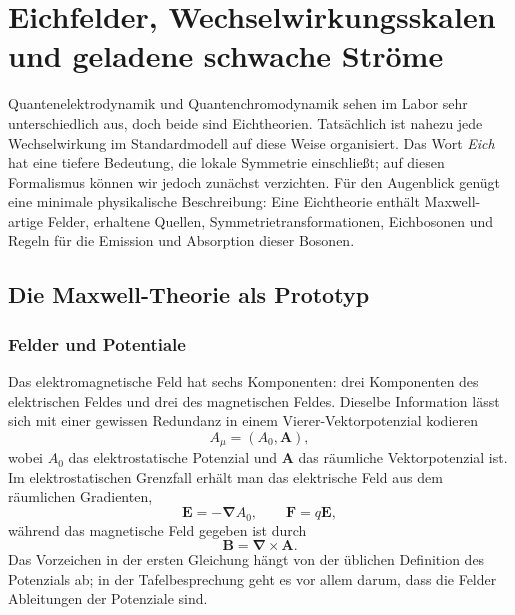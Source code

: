 \chapter{Eichfelder, Wechselwirkungsskalen und geladene schwache Ströme}

Quantenelektrodynamik und Quantenchromodynamik sehen im Labor sehr unterschiedlich aus, doch beide sind Eichtheorien. Tatsächlich ist nahezu jede Wechselwirkung im Standardmodell auf diese Weise organisiert. Das Wort \emph{Eich} hat eine tiefere Bedeutung, die lokale Symmetrie einschließt; auf diesen Formalismus können wir jedoch zunächst verzichten. Für den Augenblick genügt eine minimale physikalische Beschreibung: Eine Eichtheorie enthält Maxwell-artige Felder, erhaltene Quellen, Symmetrietransformationen, Eichbosonen und Regeln für die Emission und Absorption dieser Bosonen.

\section{Die Maxwell-Theorie als Prototyp}

\subsection{Felder und Potentiale}

Das elektromagnetische Feld hat sechs Komponenten: drei Komponenten des elektrischen Feldes und drei des magnetischen Feldes. Dieselbe Information lässt sich mit einer gewissen Redundanz in einem Vierer-Vektorpotenzial kodieren
\begin{equation}
A_\mu=(A_0,\boldsymbol A),
\end{equation}
wobei \(A_0\) das elektrostatische Potenzial und \(\boldsymbol A\) das räumliche Vektorpotenzial ist. Im elektrostatischen Grenzfall erhält man das elektrische Feld aus dem räumlichen Gradienten,
\begin{equation}
\boldsymbol E=-\boldsymbol\nabla A_0,
\qquad
\boldsymbol F=q\boldsymbol E,
\end{equation}
während das magnetische Feld gegeben ist durch
\begin{equation}
\boldsymbol B=\boldsymbol\nabla\times\boldsymbol A.
\end{equation}
Das Vorzeichen in der ersten Gleichung hängt von der üblichen Definition des Potenzials ab; in der Tafelbesprechung geht es vor allem darum, dass die Felder Ableitungen der Potenziale sind.

